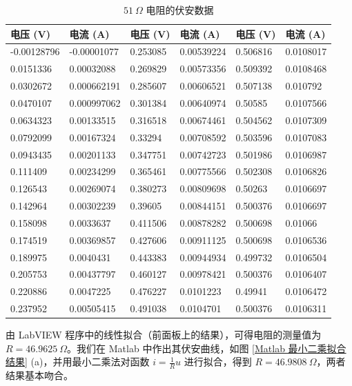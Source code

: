 \documentclass[UTF8]{article}
\theoremstyle{MyLineTheoremStyle} %
\theoremstyle{MyBlockTheoremStyle} %
\theoremstyle{MySubsubsectionStyle} %
\begin{document}
\begin{table}[H]\centering
\caption{$51 \ \Omega $ 电阻的伏安数据}
\label{51欧电阻伏安数据}
\begin{tabular}{|ll|ll|ll|}
    \hline
    电压 (V)  & 电流 (A)   & 电压 (V)  & 电流 (A)   &电压 (V)  & 电流 (A) \\ \hline
    -0.00128796 & -0.00001077   & 0.253085 & 0.00539224 & 0.506816 & 0.0108017  \\ 
    0.0151336   & 0.00032088  & 0.269829 & 0.00573356 & 0.509392 & 0.0108468  \\
    0.0302672   & 0.000662191 & 0.285607 & 0.00606521 & 0.507138 & 0.010792   \\
    0.0470107   & 0.000997062 & 0.301384 & 0.00640974 & 0.50585  & 0.0107566  \\
    0.0634323   & 0.00133515  & 0.316518 & 0.00674461 & 0.504562 & 0.0107309  \\
    0.0792099   & 0.00167324  & 0.33294  & 0.00708592 & 0.503596 & 0.0107083  \\
    0.0943435   & 0.00201133  & 0.347751 & 0.00742723 & 0.501986 & 0.0106987  \\
    0.111409    & 0.00234299  & 0.365461 & 0.00775566 & 0.502308 & 0.0106826  \\
    0.126543    & 0.00269074  & 0.380273 & 0.00809698 & 0.50263  & 0.0106697  \\
    0.142964    & 0.00302239  & 0.39605  & 0.00844151 & 0.500376 & 0.0106697  \\
    0.158098    & 0.0033637   & 0.411506 & 0.00878282 & 0.500698 & 0.01066    \\
    0.174519    & 0.00369857  & 0.427606 & 0.00911125 & 0.500698 & 0.0106536  \\
    0.189975    & 0.0040431   & 0.443383 & 0.00944934 & 0.499732 & 0.0106504  \\
    0.205753    & 0.00437797  & 0.460127 & 0.00978421 & 0.500376 & 0.0106407  \\
    0.220886    & 0.0047225   & 0.476227 & 0.0101223  & 0.49941  & 0.0106472  \\
    0.237952    & 0.00505415  & 0.491038 & 0.0104701  & 0.500376 & 0.0106311  \\
    \hline
\end{tabular}
\end{table}

由 LabVIEW 程序中的线性拟合（前面板上的结果），可得电阻的测量值为 $R = 46.9625\ \Omega$。我们在 Matlab 中作出其伏安曲线，如图 \ref{Matlab 最小二乘拟合结果} (a)，并用最小二乘法对函数 $i = \frac{1}{R}u$ 进行拟合，得到 $R = 46.9808 \ \Omega$，两者结果基本吻合。
\end{document}
